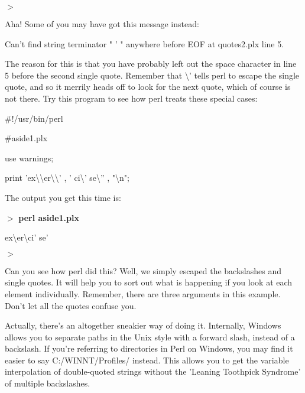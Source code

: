 \documentclass[a4paper,11pt]{book}
\begin{document}
\noindent $>$

\noindent 

\noindent Aha! Some of you may have got this message instead:

\noindent 

\noindent Can't find string terminator " ' " anywhere before EOF at quotes2.plx line 5.

\noindent 

\noindent The reason for this is that you have probably left out the space character in line 5 before the second single quote. Remember that  \textbackslash ' tells perl to escape the single quote, and so it merrily heads off to look for the next quote, which of course is not there. Try this program to see how perl treats these special cases:

\noindent 

\noindent \#!/usr/bin/perl

\noindent \#aside1.plx

\noindent use warnings;

\noindent print 'ex\textbackslash \textbackslash  er\textbackslash \textbackslash ' , ' ci\textbackslash ' se\textbackslash '' , "\textbackslash n";

\noindent 

\noindent 

\noindent The output you get this time is:

\noindent 

\noindent $>$ \textbf{perl aside1.plx}

\noindent ex\textbackslash  er\textbackslash  ci' se'

\noindent $>$

\noindent 

\noindent Can you see how perl did this? Well, we simply escaped the backslashes and single quotes. It will help you to sort out what is happening if you look at each element individually. Remember, there are three arguments in this example. Don't let all the quotes confuse you.

\noindent 

\noindent Actually, there's an altogether sneakier way of doing it. Internally, Windows allows you to separate paths in the Unix style with a forward slash, instead of a backslash. If you're referring to directories in Perl on Windows, you may find it easier to say C:/WINNT/Profiles/ instead. This allows you to get the variable interpolation of double-quoted strings without the 'Leaning Toothpick Syndrome' of multiple backslashes.
\end{document}
